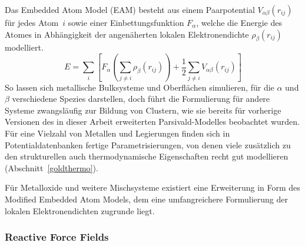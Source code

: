 Das Embedded Atom Model (EAM) besteht aus einem Paarpotential $V_{\alpha\beta}(r_{ij})$ für jedes Atom~$i$ sowie einer Einbettungsfunktion $F_\alpha$, welche die Energie des Atomes in Abhängigkeit der angenäherten lokalen Elektronendichte $\rho_\beta(r_{ij})$ modelliert\cite{daw_embedded-atom_1984}.
\begin{equation}
  E = \sum_i\left[F_\alpha\left(\sum_{j\neq i}{\rho_\beta\left(r_{ij}\right)}\right) + \frac{1}{2}\sum_{j\neq i}{V_{\alpha\beta}\left(r_{ij}\right)}\right]
\end{equation}
So lassen sich metallische Bulksysteme und Oberflächen simulieren, für die $\alpha$ und $\beta$ verschiedene Spezies darstellen, doch führt die Formulierung für andere Systeme zwangsläufig zur Bildung von Clustern, wie sie bereits für vorherige Versionen des in dieser Arbeit erweiterten Parsivald-Modelles beobachtet wurden\cite{lorenz_entwicklung_2012}.
Für eine Vielzahl von Metallen und Legierungen finden sich in Potentialdatenbanken fertige Parametrisierungen\cite{becker_interatomic_2014}, von denen viele zusätzlich zu den strukturellen auch thermodynamische Eigenschaften recht gut modellieren (Abschnitt~\ref{goldthermo}).


Für Metalloxide und weitere Mischsysteme existiert eine Erweiterung in Form des Modified Embedded Atom Models\cite{baskes_modified_1992}, dem eine umfangreichere Formulierung der lokalen Elektronendichten zugrunde liegt.



\subsubsection{Reactive Force Fields}


